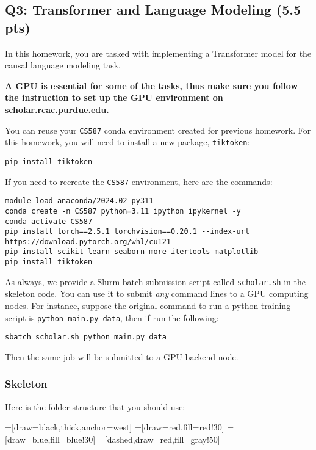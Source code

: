 \subsection*{Q3: Transformer and Language Modeling (5.5 pts)}


In this homework, you are tasked with implementing a Transformer model for the causal language modeling task.

\hfill


\textbf{A GPU is essential for some of the tasks, thus make sure you follow the
instruction to set up the GPU environment on scholar.rcac.purdue.edu.}
%

% 
You can reuse your \texttt{CS587} conda environment created for previous homework. 
%
For this homework, you will need to install a new package, \texttt{tiktoken}:

{\color{red}
\begin{verbatim}
pip install tiktoken
\end{verbatim}
}

If you need to recreate the \texttt{CS587} environment, here are the commands:

\begin{verbatim}
module load anaconda/2024.02-py311
conda create -n CS587 python=3.11 ipython ipykernel -y
conda activate CS587
pip install torch==2.5.1 torchvision==0.20.1 --index-url https://download.pytorch.org/whl/cu121
pip install scikit-learn seaborn more-itertools matplotlib 
pip install tiktoken
\end{verbatim}

As always, we provide a Slurm batch submission script called \texttt{scholar.sh} in the skeleton code. You can use it to submit \emph{any} command lines to a GPU computing nodes. For instance, suppose the original command to run a python training script is \texttt{python main.py data}, then if run the following:
\begin{verbatim}
sbatch scholar.sh python main.py data
\end{verbatim}
Then the same job will be submitted to a GPU backend node. 

%
\subsubsection*{Skeleton}
%

%
\noindent Here is the folder structure that you should use:

%
=[draw=black,thick,anchor=west]
=[draw=red,fill=red!30]
=[draw=blue,fill=blue!30]
=[dashed,draw=red,fill=gray!50]
%

